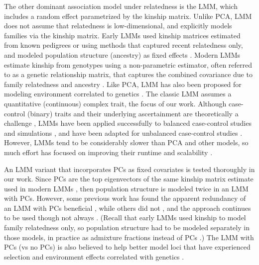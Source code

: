 \documentclass[11pt]{article}
\begin{document}
\begin{linenumbers}
The other dominant association model under relatedness is the LMM, which includes a random effect parametrized by the kinship matrix.
Unlike PCA, LMM does not assume that relatedness is low-dimensional, and explicitly models families via the kinship matrix.
Early LMMs used kinship matrices estimated from known pedigrees or using methods that captured recent relatedness only, and modeled population structure (ancestry) as fixed effects \citep{yu_unified_2006, zhao_arabidopsis_2007, zhu_nonmetric_2009}.
Modern LMMs estimate kinship from genotypes using a non-parametric estimator, often referred to as a genetic relationship matrix, that captures the combined covariance due to family relatedness and ancestry \citep{kang_efficient_2008, astle_population_2009, ochoa_estimating_2021}.
Like PCA, LMM has also been proposed for modeling environment correlated to genetics \citep{vilhjalmsson_nature_2013, wang_trade-offs_2022}.
The classic LMM assumes a quantitative (continuous) complex trait, the focus of our work.
Although case-control (binary) traits and their underlying ascertainment are theoretically a challenge \citep{yang_advantages_2014}, LMMs have been applied successfully to balanced case-control studies \citep{astle_population_2009, kang_variance_2010} and simulations \citep{price_new_2010, wu_comparison_2011, sul_mixed_2013}, and have been adapted for unbalanced case-control studies \citep{zhou_efficiently_2018}.
However, LMMs tend to be considerably slower than PCA and other models, so much effort has focused on improving their runtime and scalability \citep{aulchenko_genomewide_2007, kang_efficient_2008, kang_variance_2010, zhang_mixed_2010, lippert_fast_2011, yang_gcta:_2011, listgarten_improved_2012, zhou_genome-wide_2012, svishcheva_rapid_2012, loh_efficient_2015, zhou_efficiently_2018}.

An LMM variant that incorporates PCs as fixed covariates is tested thoroughly in our work.
Since PCs are the top eigenvectors of the same kinship matrix estimate used in modern LMMs \citep{astle_population_2009, janss_inferences_2012, hoffman_correcting_2013, zhang_principal_2015}, then population structure is modeled twice in an LMM with PCs.
However, some previous work has found the apparent redundancy of an LMM with PCs beneficial \citep{price_new_2010, tucker_improving_2014, zhang_principal_2015}, while others did not \citep{liu_controlling_2011, janss_inferences_2012}, and the approach continues to be used \citep{zeng_signatures_2018, mbatchou_computationally_2021} though not always \citep{matoba_gwas_2020}.
(Recall that early LMMs used kinship to model family relatedness only, so population structure had to be modeled separately in those models, in practice as admixture fractions instead of PCs \citep{yu_unified_2006, zhao_arabidopsis_2007, zhu_nonmetric_2009}.)
The LMM with PCs (vs no PCs) is also believed to help better model loci that have experienced selection \citep{price_new_2010, vilhjalmsson_nature_2013} and environment effects correlated with genetics \citep{zhang_principal_2015}.


\end{linenumbers}
\end{document}
